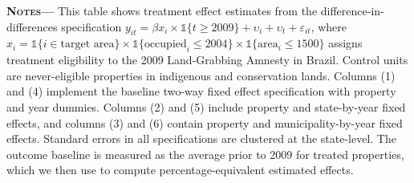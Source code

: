 \documentclass[12pt]{article}
\begin{document}
\begin{center}
\begin{threeparttable}[b]
\begin{tabular}{l*{6}c}
   \midrule \midrule
	\end{tabular}
			\begin{tablenotes}[flushleft]
   \item {\justify\singlespacing\footnotesize {\textsc{\textbf{Notes---}}} This table shows treatment effect estimates from the difference-in-differences specification $ y_{it}   = \beta x_i\times\mathbb{1}\{t\geq 2009\}+\upsilon_i+\upsilon_t+\varepsilon_{it} $, where $x_i=\mathbb{1}\{i \in \text{target area} \}\times\mathbb{1}\{\text{occupied}_i\leq 2004 \}\times\mathbb{1}\{\text{area}_i\leq 1500 \}$ assigns treatment eligibility to the 2009 Land-Grabbing Amnesty in Brazil. Control units are never-eligible properties in indigenous and conservation lands. Columns (1) and (4) implement the baseline two-way fixed effect specification with property and year dummies. Columns (2) and (5) include property and state-by-year fixed effects, and columns (3) and (6) contain property and municipality-by-year fixed effects. Standard errors in all specifications are clustered at the state-level. The outcome baseline is measured as the average prior to 2009 for treated properties, which we then use to compute percentage-equivalent estimated effects. }
    \end{tablenotes}
     \label{tab:2}
\end{threeparttable}
\end{center}

\clearpage
\end{document}
